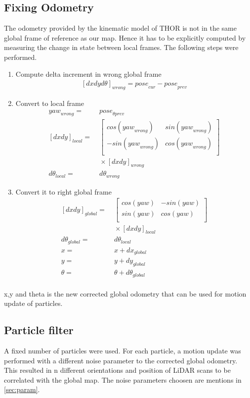 \documentclass[fleqn,10pt]{SelfArx} %
\begin{document}
\subsection{Fixing Odometry}
\label{subsec:odom}
The odometry provided by the kinematic model of THOR is not in the same global frame of reference as our map. Hence it has to be explicitly computed by measuring the change in state between local frames. The following steps were performed.
\begin{enumerate}
\item Compute delta increment in wrong global frame
\begin{align*}
{[dx dy d\theta]}_{wrong} = {pose}_{cur}-{pose}_{prev}
\end{align*}
\item Convert to local frame
\begin{align*}
{yaw}_{wrong} =&\;  {pose}_{\theta prev} \\
{[dx dy]}_{local} =&\; 
\begin{bmatrix}
cos({yaw}_{wrong}) & sin({yaw}_{wrong}) \\
-sin({yaw}_{wrong}) & cos({yaw}_{wrong}) \\
\end{bmatrix} \\
&\; \times {[dx dy]}_{wrong} \\
{d\theta}_{local} =&\; {d\theta}_{wrong}
\end{align*}
\item Convert it to right global frame
\begin{align*}
{[dx dy]}_{global}=&\;
\begin{bmatrix}
cos(yaw) & -sin(yaw) \\
sin(yaw) & cos(yaw) \\
\end{bmatrix} \\
&\; \times {[dx dy]}_{local} \\
{d\theta}_{global} =&\; {d\theta}_{local } \\ 
x =&\; x+{dx}_{global} \\
y =&\; y+{dy}_{global} \\
\theta =&\; \theta+{d\theta}_{global} \\
\end{align*}
\end{enumerate}
x,y and theta is the new corrected global odometry that can be used for motion update of particles.

\subsection{Particle filter}
\label{subsec:pf}
A fixed number of particles were used. For each particle, a motion update was performed with a different noise parameter to the corrected global odometry. This resulted in n different orientations and position of LiDAR scans to be correlated with the global map. The noise parameters choosen are mentions in \ref{sec:param}.
\end{document}
